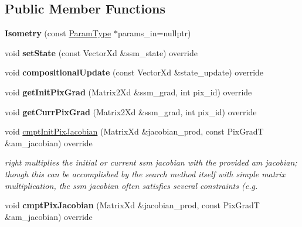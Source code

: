\subsection*{Public Member Functions}
\begin{DoxyCompactItemize}
\item 
\hypertarget{classIsometry_a8d42b84041c707fb78293997f6af74cf}{{\bfseries Isometry} (const \hyperlink{structIsometryParams}{Param\-Type} $\ast$params\-\_\-in=nullptr)}\label{classIsometry_a8d42b84041c707fb78293997f6af74cf}

\item 
\hypertarget{classIsometry_a6a715c778f6b83b90aedadd66af54a71}{void {\bfseries set\-State} (const Vector\-Xd \&ssm\-\_\-state) override}\label{classIsometry_a6a715c778f6b83b90aedadd66af54a71}

\item 
\hypertarget{classIsometry_a6fdef572b0337a3f40661e04ddd22392}{void {\bfseries compositional\-Update} (const Vector\-Xd \&state\-\_\-update) override}\label{classIsometry_a6fdef572b0337a3f40661e04ddd22392}

\item 
\hypertarget{classIsometry_afa2764a79795b00fa51003e1bb7c6455}{void {\bfseries get\-Init\-Pix\-Grad} (Matrix2\-Xd \&ssm\-\_\-grad, int pix\-\_\-id) override}\label{classIsometry_afa2764a79795b00fa51003e1bb7c6455}

\item 
\hypertarget{classIsometry_a131f8508f10a7f11a805a303561fec11}{void {\bfseries get\-Curr\-Pix\-Grad} (Matrix2\-Xd \&ssm\-\_\-grad, int pix\-\_\-id) override}\label{classIsometry_a131f8508f10a7f11a805a303561fec11}

\item 
void \hyperlink{classIsometry_aec3c4d4f20d5c34ee3ab79747e6e1532}{cmpt\-Init\-Pix\-Jacobian} (Matrix\-Xd \&jacobian\-\_\-prod, const Pix\-Grad\-T \&am\-\_\-jacobian) override
\begin{DoxyCompactList}\small\item\em right multiplies the initial or current ssm jacobian with the provided am jacobian; though this can be accomplished by the search method itself with simple matrix multiplication, the ssm jacobian often satisfies several constraints (e.\-g. \end{DoxyCompactList}\item 
\hypertarget{classIsometry_ab6e11d449bb08e28163be23e322a298f}{void {\bfseries cmpt\-Pix\-Jacobian} (Matrix\-Xd \&jacobian\-\_\-prod, const Pix\-Grad\-T \&am\-\_\-jacobian) override}\label{classIsometry_ab6e11d449bb08e28163be23e322a298f}


\end{DoxyCompactItemize}

